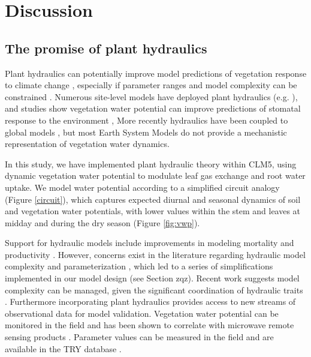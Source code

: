 \documentclass[draft,linenumbers]{agujournal}
\begin{document}
\section{Discussion}
\subsection{The promise of plant hydraulics}
    Plant hydraulics can potentially improve model predictions of vegetation response to climate change \citep{sperry2015}, 
    especially if parameter ranges and model complexity can be constrained \citep{rogers2017}.
    Numerous site-level models have deployed plant hydraulics (e.g. \citet{williams1996,sperry1998,bohrer2005}), and studies show
    vegetation water potential can improve predictions of stomatal response to the environment \citep{sperry2017,anderegg2017},
    More recently hydraulics have been coupled to global models \citep{bonan2014,xu2016,christoffersen2016}, 
    but most Earth System Models do not provide a mechanistic representation of vegetation water dynamics.

    In this study, we have implemented plant hydraulic theory within CLM5, 
    using dynamic vegetation water potential to modulate leaf gas exchange and root water uptake.
    We model water potential according to a simplified circuit analogy (Figure \ref{circuit}), 
    which captures expected diurnal and seasonal dynamics of soil and vegetation water potentials, with lower values within the stem and leaves at midday and during the dry season (Figure \ref{fig:vwp}).


    Support for hydraulic models include improvements in modeling mortality and productivity \citep{mcdowell2018,choat2012}.
    However, concerns exist in the literature regarding hydraulic model complexity and parameterization \citep{verhoef2014,drake2017}, 
    which led to a series of simplifications implemented in our model design (see Section zqz).
    Recent work suggests model complexity can be managed, given the significant coordination of hydraulic traits \citep{bartlett2016,christoffersen2016}.
    Furthermore incorporating plant hydraulics provides access to new streams of observational data for model validation.
    Vegetation water potential can be monitored in the field \citep{boyer1967} and has been shown to correlate with microwave remote sensing products \citep{momen2017}.
    Parameter values can be measured in the field \citep{sack2002} and are available in the TRY database \citep{kattge2011}.
\end{document}
